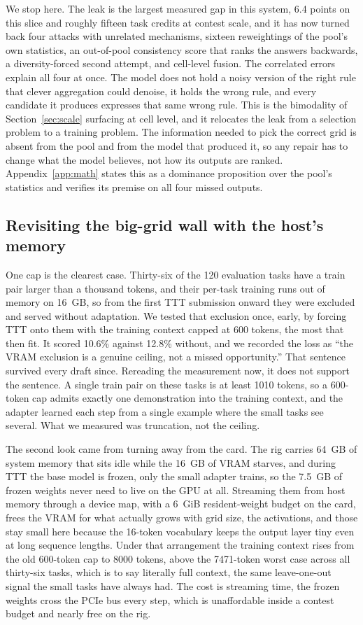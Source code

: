 \documentclass[11pt]{article}
\begin{document}
We stop here. The leak is the largest measured gap in this system, 6.4
points on this slice and roughly fifteen task credits at contest scale, and it has now turned back four
attacks with unrelated mechanisms, sixteen reweightings of the pool's own statistics, an out-of-pool
consistency score that ranks the answers backwards, a diversity-forced second attempt, and cell-level
fusion. The correlated errors explain all four at once. The model does not hold a noisy version of the
right rule that clever aggregation could denoise, it holds the wrong rule, and every candidate it produces
expresses that same wrong rule. This is the bimodality of Section~\ref{sec:scale} surfacing at cell level,
and it relocates the leak from a selection problem to a training problem. The information needed to pick
the correct grid is absent from the pool and from the model that produced it, so any repair has to change
what the model believes, not how its outputs are ranked. Appendix~\ref{app:math} states this as a
dominance proposition over the pool's statistics and verifies its premise on all four missed outputs.

\subsection{Revisiting the big-grid wall with the host's memory}
\label{sec:biggrid}
One cap is the clearest case. Thirty-six of the 120 evaluation tasks have a train
pair larger than a thousand tokens, and their per-task training runs out of memory on 16~GB, so from the
first TTT submission onward they were excluded and served without adaptation. We tested that exclusion once,
early, by forcing TTT onto them with the training context capped at 600 tokens, the most that then fit. It
scored 10.6\% against 12.8\% without, and we recorded the loss as ``the VRAM exclusion is a genuine ceiling,
not a missed opportunity.'' That sentence survived every draft since. Rereading the measurement now, it does
not support the sentence. A single train pair on these tasks is at least 1010 tokens, so a 600-token cap
admits exactly one demonstration into the training context, and the adapter learned each step from a single
example where the small tasks see several. What we measured was truncation, not the ceiling.

The second look came from turning away from the card. The rig carries 64~GB of system memory that sits idle
while the 16~GB of VRAM starves, and during TTT the base model is frozen, only the small adapter trains, so
the 7.5~GB of frozen weights never need to live on the GPU at all. Streaming them from host memory through
a device map, with a 6~GiB resident-weight budget on the card, frees the VRAM for what actually grows with
grid size, the activations, and those stay small here because the 16-token vocabulary keeps the output layer
tiny even at long sequence lengths. Under that arrangement the training context rises from the old 600-token
cap to 8000 tokens, above the 7471-token worst case across all thirty-six tasks, which is to say literally
full context, the same leave-one-out signal the small tasks have always had. The cost is streaming time, the
frozen weights cross the PCIe bus every step, which is unaffordable inside a contest budget and nearly free
on the rig.
\end{document}
